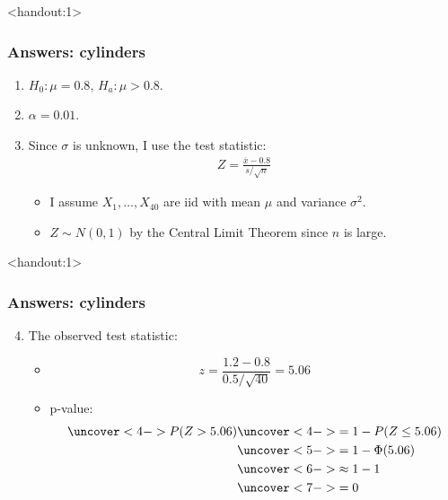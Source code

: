 \documentclass[handout]{beamer}\usepackage[]{graphicx}\usepackage[]{color}
\newcommand{\answers}{1}
\providecommand{\ov}[1]{\overline{#1}}
\numberwithin{equation}{section}
\begin{document}
\begin{frame}<handout:\answers>
\frametitle{Answers: cylinders}
\begin{enumerate}[1. ]
\item $H_0: \mu = 0.8$, $H_a: \mu > 0.8$.
\pause \item $\alpha = 0.01$.
\pause \item Since $\sigma$ is unknown, I use the test statistic:
\begin{align*}
Z = \frac{\ov{x} - 0.8}{s/\sqrt{n}}
\end{align*}
\begin{itemize}
\pause \item I assume $X_1, \ldots, X_{40}$ are iid with mean $\mu$ and variance $\sigma^2$.
\pause \item $Z \sim N(0,1)$ by the Central Limit Theorem since $n$ is large.
\end{itemize}
\end{enumerate}
\end{frame}

\begin{frame}<handout:\answers>
\frametitle{Answers: cylinders}
\begin{enumerate}
\setcounter{enumi}{3}
\item The observed test statistic:
\begin{itemize}
\pause \item \[z= \frac{1.2 -  0.8}{0.5/\sqrt{40}} = 5.06 \]
\pause \item  p-value:
\begin{align*}
\uncover<4->{P(Z > 5.06)} & \uncover<4->{= 1 - P(Z \le 5.06)} \\
&\uncover<5->{= 1 - \Phi(5.06)} \\
&\uncover<6->{\approx 1 - 1} \\
&\uncover<7->{= 0}
\end{align*}
\end{itemize}
\end{enumerate}
\end{frame}
\end{document}
